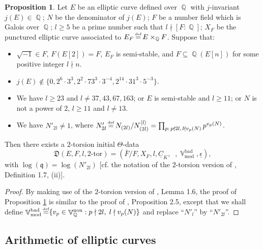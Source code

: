 \documentclass[a4paper, 12pt]{article}
\DeclareMathOperator{\uV}{\underline{\V}}
\DeclareMathOperator{\defeq}{\overset{\text{\tiny{def}}}{=}}
\DeclareMathOperator{\Q}{\mathbb{Q}}
\DeclareMathOperator{\V}{\mathbb{V}}
\DeclareMathOperator{\bad}{\text{bad}}
\DeclareMathOperator{\non}{\text{non}}
\DeclareMathOperator{\tmod}{\text{mod}}
\newcommand{\lagl}{\langle l \rangle}
\numberwithin{equation}{section}
\theoremstyle{definition}
\newtheorem{prop}[thm]{Proposition}
\begin{document}
\begin{prop} \label{1-prop: construction of mu_2 initial Theta-data}
Let $E$ be an elliptic curve defined over $\Q$ with $j$-invariant $j(E) \in \Q$;
$N$ be the denominator of $j(E)$;
$F$ be a number field which is Galois over $\Q$;
$l\ge 5$ be a prime number such that $l\nmid [F:\Q]$;
$X_F$ be the punctured elliptic curve associated to $E_F \defeq E \times_{\Q} F$.
Suppose that:
\begin{itemize}
\item[(a)] $\sqrt{-1}\in F$, $F(E[2]) = F$, $E_F$ is semi-stable, and $F \subseteq \Q(E[n])$ for some positive integer $l\nmid n$. 
\item[(b)] $j(E)\notin \{0,2^6\cdot 3^3,2^2\cdot 73^3\cdot 3^{-4},2^{14}\cdot 31^3\cdot 5^{-3}\}$.
\item[(c)] We have $l\ge 23$ and $l\neq 37,43,67,163$; or $E$ is semi-stable and $l\ge 11$; or $N$ is not a power of $2$, $l\ge 11$ and $l\neq 13$.
\item[(d)] We have $N'_{2l} \neq 1$, where $N'_{2l} \defeq N_{(2l)} / N_{(2l)}^{\lagl} = \prod_{p:\, p\nmid 2l,\, l\nmid v_p(N)} p^{v_p(N)}$.
\end{itemize} 
Then there exists a $2$-torsion initial $\Theta$-data $$\mathfrak D(E,F,l,2\text{-tor}) = (\bar{F}/F,X_F,l,\underline{C}_K, \uV,\V_{\tmod}^{\bad}, \underline{\epsilon}),$$ 
with $\log(\mathfrak q) = \log(N'_{2l})$ [cf. the notation of the $2$-torsion version of \cite{Diophantine_after_IUT_I}, Definition 1.7, (ii)].
\end{prop}
\begin{proof}
By making use of the $2$-torsion version of \cite{Diophantine_after_IUT_I}, Lemma 1.6, the proof of Proposition \ref{1-prop: construction of mu_2 initial Theta-data} is similar to the proof of \cite{Diophantine_after_IUT_I}, Proposition 2.5, except that we shall define $\V_{\tmod}^{\bad} \defeq \{v_p \in \V_{\Q}^{\non}: p\nmid 2l,\; l \nmid v_p(N) \}$ and replace ``$N'_l$'' by ``$N'_{2l}$''.
\end{proof}


\subsection{Arithmetic of elliptic curves}
\end{document}
